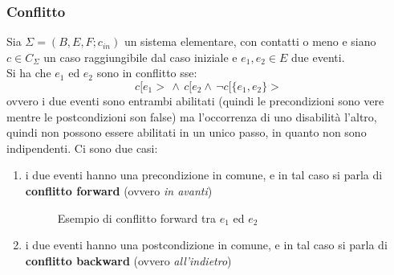\documentclass[a4paper,12pt, oneside]{book}
\begin{document}
\subsubsection{Conflitto}
\begin{definizione}
  Sia $\Sigma = (B,E,F;c_{in})$ un sistema elementare, con contatti o meno
  e siano $c\in C_\Sigma$ un caso raggiungibile dal caso iniziale e $e_1,e_2\in
  E$ due eventi.\\
  Si ha che $e_1$ ed $e_2$ sono in conflitto sse:
  \[c[e_1>\,\wedge\, c[e_2 \wedge\,\neg c[\{e_1,e_2\}>\]
  ovvero i due eventi sono entrambi abilitati (quindi le precondizioni sono vere
  mentre le postcondizioni son false) ma l'occorrenza di uno disabilità
  l'altro, quindi non possono essere abilitati in un unico passo, in quanto non
  sono indipendenti. Ci sono due casi:
  \begin{enumerate}
    \item i due eventi hanno una precondizione in comune, e in tal caso si parla
    di \textbf{conflitto forward} (ovvero \textit{in avanti})
    \begin{figure}[H]
      \centering
      \caption{Esempio di conflitto forward tra $e_1$ ed $e_2$}
    \end{figure}
    \item i due eventi hanno una postcondizione in comune, e in tal caso si parla
    di \textbf{conflitto backward} (ovvero \textit{all'indietro})
    \begin{figure}[H]
      \centering
\end{figure}
\end{enumerate}
\end{definizione}
\end{document}
